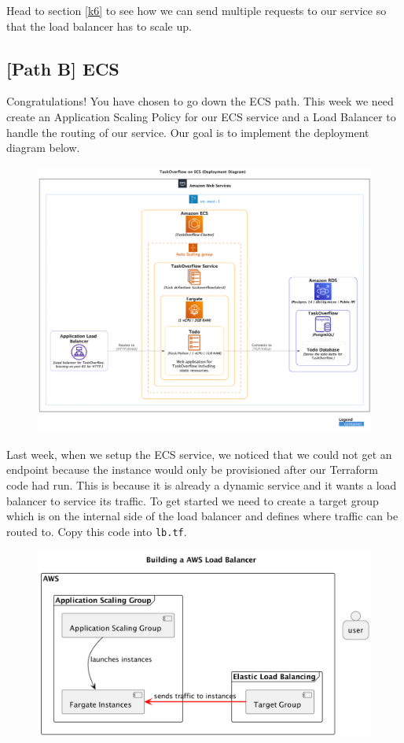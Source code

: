 \documentclass{csse4400}
\begin{document}
Head to section \ref{k6} to see how we can send multiple requests to our service so that the load balancer has to scale up.

\subsection{[Path B] ECS}

Congratulations! You have chosen to go down the ECS path.
This week we need create an Application Scaling Policy for our ECS service
and a Load Balancer to handle the routing of our service.
Our goal is to implement the deployment diagram below.

\begin{figure}[H]
  \includegraphics[width=\textwidth]{diagrams/ecsdeployment}
\end{figure}

Last week, when we setup the ECS service, we noticed that we could not get an endpoint because the instance would only be provisioned after our Terraform code had run. This is because it is already a dynamic service and it wants a load balancer to service its traffic. To get started we need to create a target group which is on the internal side of the load balancer and defines where traffic can be routed to. Copy this code into \texttt{lb.tf}.

\begin{figure}[H]
  \begin{center}
    \includegraphics[scale=0.2]{diagrams/lb2fargate}
  \end{center}
\end{figure}
\end{document}
